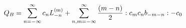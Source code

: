 \begin{equation}
Q_B = \sum_{n = -\infty}^{\infty}  c_nL_{-n}^{({\rm m})}
+ \sum_{n, m = -\infty}^{ \infty}  \frac{(m-n)}{2} 
:c_mc_nb_{-m-n}:-c_0
\label{eq:BRST}
\end{equation}

